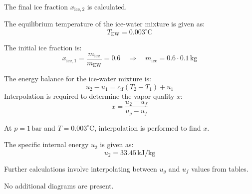 The final ice fraction \( x_{\text{ice},2} \) is calculated.  

The equilibrium temperature of the ice-water mixture is given as:  
\[
T_{\text{EW}} = 0.003^\circ\text{C}
\]  

The initial ice fraction is:  
\[
x_{\text{ice},1} = \frac{m_{\text{ice}}}{m_{\text{EW}}} = 0.6 \quad \Rightarrow \quad m_{\text{ice}} = 0.6 \cdot 0.1 \, \text{kg}
\]  

The energy balance for the ice-water mixture is:  
\[
u_2 - u_1 = c_{\text{if}} (T_2 - T_1) + u_1
\]  
Interpolation is required to determine the vapor quality \( x \):  
\[
x = \frac{u_2 - u_f}{u_g - u_f}
\]  

At \( p = 1 \, \text{bar} \) and \( T = 0.003^\circ\text{C} \), interpolation is performed to find \( x \).  

The specific internal energy \( u_2 \) is given as:  
\[
u_2 = 33.45 \, \text{kJ/kg}
\]  

Further calculations involve interpolating between \( u_g \) and \( u_f \) values from tables.  

No additional diagrams are present.